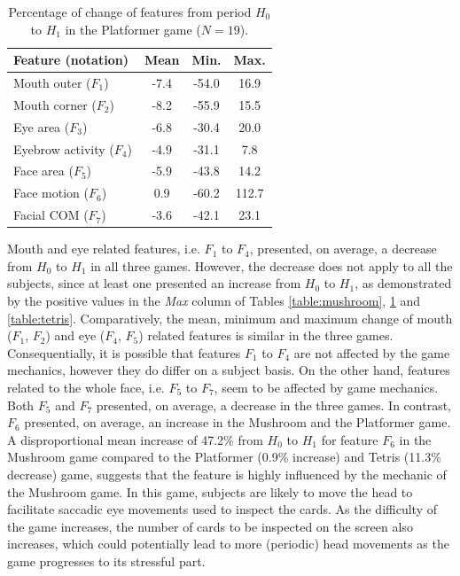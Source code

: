 \begin{table}
    \caption{Percentage of change of features from period $H_0$ to $H_1$ in the Platformer game ($N=19$).}
    \label{table:platformer}
    \centering
    \begin{threeparttable}
        \begin{tabular}{lccc}
            \toprule%
                \textbf{Feature (notation)} & \textbf{Mean} & \textbf{Min.} & \textbf{Max.} \\
            \midrule%
                Mouth outer ($F_1$)      & -7.4 & -54.0 & 16.9  \\
                Mouth corner ($F_2$)     & -8.2 & -55.9 & 15.5  \\
                Eye area ($F_3$)         & -6.8 & -30.4 & 20.0  \\
                Eyebrow activity ($F_4$) & -4.9 & -31.1 & 7.8   \\
                Face area ($F_5$)        & -5.9 & -43.8 & 14.2  \\
                Face motion ($F_6$)      & 0.9  & -60.2 & 112.7 \\
                Facial COM ($F_7$)       & -3.6 & -42.1 & 23.1  \\
            \bottomrule%
        \end{tabular}
        \begin{tablenotes}
          \small
          \item[]{}
        \end{tablenotes}
    \end{threeparttable}
\end{table}

Mouth and eye related features, i.e. $F_1$ to $F_4$, presented, on average, a decrease from $H_0$ to $H_1$ in all three games. However, the decrease does not apply to all the subjects, since at least one presented an increase from $H_0$ to $H_1$, as demonstrated by the positive values in the \textit{Max} column of Tables \ref{table:mushroom}, \ref{table:platformer} and \ref{table:tetris}. Comparatively, the mean, minimum and maximum change of mouth ($F_1$, $F_2$) and eye ($F_4$, $F_5$) related features is similar in the three games. Consequentially, it is possible that features $F_1$ to $F_4$ are not affected by the game mechanics, however they do differ on a subject basis. On the other hand, features related to the whole face, i.e. $F_5$ to $F_7$, seem to be affected by game mechanics. Both $F_5$ and $F_7$ presented, on average, a decrease in the three games. In contrast, $F_6$ presented, on average, an increase in the Mushroom and the Platformer game. A disproportional mean increase of 47.2\% from $H_0$ to $H_1$ for feature $F_6$ in the Mushroom game compared to the Platformer (0.9\% increase) and Tetris (11.3\% decrease) game, suggests that the feature is highly influenced by the mechanic of the Mushroom game. In this game, subjects are likely to move the head to facilitate saccadic eye movements used to inspect the cards. As the difficulty of the game increases, the number of cards to be inspected on the screen also increases, which could potentially lead to more (periodic) head movements as the game progresses to its stressful part.

